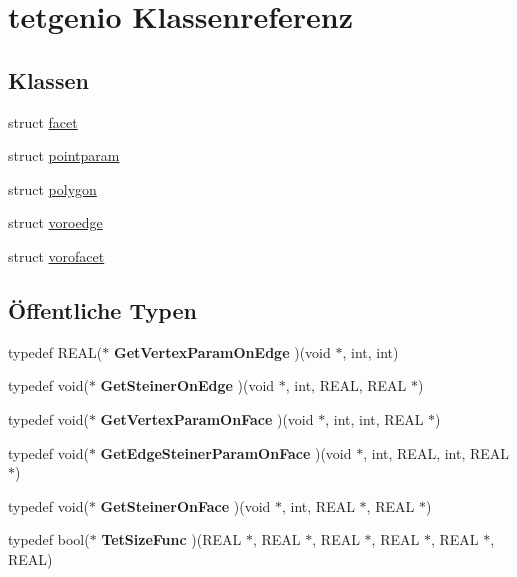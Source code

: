 \hypertarget{classtetgenio}{\section{tetgenio Klassenreferenz}
\label{classtetgenio}
}
\subsection*{Klassen}
\begin{DoxyCompactItemize}
\item 
struct \hyperlink{structtetgenio_1_1facet}{facet}
\item 
struct \hyperlink{structtetgenio_1_1pointparam}{pointparam}
\item 
struct \hyperlink{structtetgenio_1_1polygon}{polygon}
\item 
struct \hyperlink{structtetgenio_1_1voroedge}{voroedge}
\item 
struct \hyperlink{structtetgenio_1_1vorofacet}{vorofacet}
\end{DoxyCompactItemize}
\subsection*{Öffentliche Typen}
\begin{DoxyCompactItemize}
\item 
\hypertarget{classtetgenio_a57d18c4c976af43f3e9743a11f78f1f7}{typedef R\-E\-A\-L($\ast$ {\bfseries Get\-Vertex\-Param\-On\-Edge} )(void $\ast$, int, int)}\label{classtetgenio_a57d18c4c976af43f3e9743a11f78f1f7}

\item 
\hypertarget{classtetgenio_ab5ba46cbbf0dd7ebc4875fa70b7f1c65}{typedef void($\ast$ {\bfseries Get\-Steiner\-On\-Edge} )(void $\ast$, int, R\-E\-A\-L, R\-E\-A\-L $\ast$)}\label{classtetgenio_ab5ba46cbbf0dd7ebc4875fa70b7f1c65}

\item 
\hypertarget{classtetgenio_a722d4a1ab76513e917be3466b85bb78f}{typedef void($\ast$ {\bfseries Get\-Vertex\-Param\-On\-Face} )(void $\ast$, int, int, R\-E\-A\-L $\ast$)}\label{classtetgenio_a722d4a1ab76513e917be3466b85bb78f}

\item 
\hypertarget{classtetgenio_a351895a0365ff101d0400f18e1145e76}{typedef void($\ast$ {\bfseries Get\-Edge\-Steiner\-Param\-On\-Face} )(void $\ast$, int, R\-E\-A\-L, int, R\-E\-A\-L $\ast$)}\label{classtetgenio_a351895a0365ff101d0400f18e1145e76}

\item 
\hypertarget{classtetgenio_a1f2d237a6b36007f8b3e3557cb9b5451}{typedef void($\ast$ {\bfseries Get\-Steiner\-On\-Face} )(void $\ast$, int, R\-E\-A\-L $\ast$, R\-E\-A\-L $\ast$)}\label{classtetgenio_a1f2d237a6b36007f8b3e3557cb9b5451}

\item 
\hypertarget{classtetgenio_aa1b228427a0bdabc66cead91dd4497b8}{typedef bool($\ast$ {\bfseries Tet\-Size\-Func} )(R\-E\-A\-L $\ast$, R\-E\-A\-L $\ast$, R\-E\-A\-L $\ast$, R\-E\-A\-L $\ast$, R\-E\-A\-L $\ast$, R\-E\-A\-L)}\label{classtetgenio_aa1b228427a0bdabc66cead91dd4497b8}

\end{DoxyCompactItemize}
